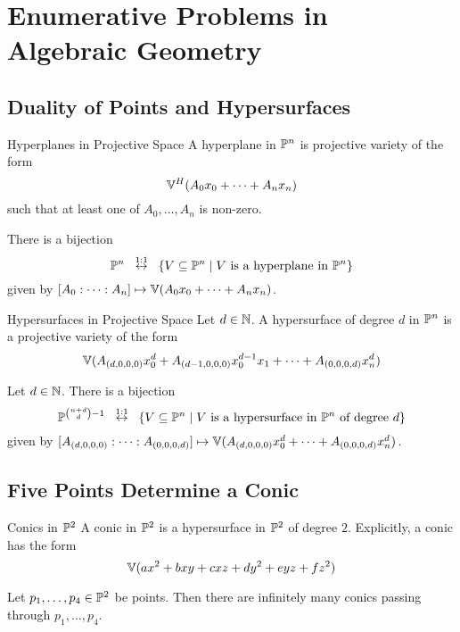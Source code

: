 \documentclass[a4paper]{article}
\begin{document}
\pagebreak
\section{Enumerative Problems in Algebraic Geometry}
\subsection{Duality of Points and Hypersurfaces}
\begin{defn}{Hyperplanes in Projective Space}{} A hyperplane in $\mathbb{P}^n$ is projective variety of the form $$\mathbb{V}^H(A_0x_0+\cdots+A_nx_n)$$ such that at least one of $A_0,\dots,A_n$ is non-zero. 
\end{defn}

\begin{prp}{}{} There is a bijection $$\mathbb{P}^n\;\;\overset{1:1}{\leftrightarrow}\;\;\{V\subseteq\mathbb{P}^n\;|\;V\text{ is a hyperplane in }\mathbb{P}^n\}$$ given by $[A_0:\cdots:A_n]\mapsto\mathbb{V}(A_0x_0+\cdots+A_nx_n)$. 
\end{prp}

\begin{defn}{Hypersurfaces in Projective Space}{} Let $d\in\mathbb{N}$. A hypersurface of degree $d$ in $\mathbb{P}^n$ is a projective variety of the form $$\mathbb{V}(A_{(d,0,0,0)}x_0^d+A_{(d-1,0,0,0)}x_0^{d-1}x_1+\cdots+A_{(0,0,0,d)}x_n^d)$$
\end{defn}

\begin{prp}{}{} Let $d\in\mathbb{N}$. There is a bijection $$\mathbb{P}^{\binom{n+d}{d}-1}\;\;\overset{1:1}{\leftrightarrow}\;\;\{V\subseteq\mathbb{P}^n\;|\;V\text{ is a hypersurface in }\mathbb{P}^n\text{ of degree }d\}$$ given by $[A_{(d,0,0,0)}:\cdots:A_{(0,0,0,d)}]\mapsto\mathbb{V}(A_{(d,0,0,0)}x_0^d+\cdots+A_{(0,0,0,d)}x_n^d)$. 
\end{prp}

\subsection{Five Points Determine a Conic}
\begin{defn}{Conics in $\mathbb{P}^2$}{} A conic in $\mathbb{P}^2$ is a hypersurface in $\mathbb{P}^2$ of degree $2$. Explicitly, a conic has the form $$\mathbb{V}(ax^2+bxy+cxz+dy^2+eyz+fz^2)$$
\end{defn}

\begin{prp}{}{} Let $p_1,\dots,p_4\in\mathbb{P}^2$ be points. Then there are infinitely many conics passing through $p_1,\dots,p_4$. 
\end{prp}
\end{document}
